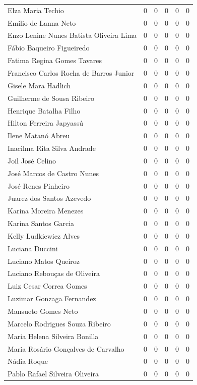 \documentclass[12pt,brazil]{article}\usepackage[]{graphicx}\usepackage[]{xcolor}
\begin{document}
\begin{longtable}{lrrrrr}
Elza Maria Techio & 0 & 0 & 0 & 0 & 0 \\
Emilio de Lanna Neto & 0 & 0 & 0 & 0 & 0 \\
Enzo Lenine Nunes Batista Oliveira Lima & 0 & 0 & 0 & 0 & 0 \\
Fábio Baqueiro Figueiredo & 0 & 0 & 0 & 0 & 0 \\
Fatima Regina Gomes Tavares & 0 & 0 & 0 & 0 & 0 \\
Francisco Carlos Rocha de Barros Junior & 0 & 0 & 0 & 0 & 0 \\
Gisele Mara Hadlich & 0 & 0 & 0 & 0 & 0 \\
Guilherme de Sousa Ribeiro & 0 & 0 & 0 & 0 & 0 \\
Henrique Batalha Filho & 0 & 0 & 0 & 0 & 0 \\
Hilton Ferreira Japyassú & 0 & 0 & 0 & 0 & 0 \\
Ilene Matanó Abreu & 0 & 0 & 0 & 0 & 0 \\
Inacilma Rita Silva Andrade & 0 & 0 & 0 & 0 & 0 \\
Joil José Celino & 0 & 0 & 0 & 0 & 0 \\
José Marcos de Castro Nunes & 0 & 0 & 0 & 0 & 0 \\
José Renes Pinheiro & 0 & 0 & 0 & 0 & 0 \\
Juarez dos Santos Azevedo & 0 & 0 & 0 & 0 & 0 \\
Karina Moreira Menezes & 0 & 0 & 0 & 0 & 0 \\
Karina Santos Garcia & 0 & 0 & 0 & 0 & 0 \\
Kelly Ludkiewicz Alves & 0 & 0 & 0 & 0 & 0 \\
Luciana Duccini & 0 & 0 & 0 & 0 & 0 \\
Luciano Matos Queiroz & 0 & 0 & 0 & 0 & 0 \\
Luciano Rebouças de Oliveira & 0 & 0 & 0 & 0 & 0 \\
Luiz Cesar Correa Gomes & 0 & 0 & 0 & 0 & 0 \\
Luzimar Gonzaga Fernandez & 0 & 0 & 0 & 0 & 0 \\
Mansueto Gomes Neto & 0 & 0 & 0 & 0 & 0 \\
Marcelo Rodrigues Souza Ribeiro & 0 & 0 & 0 & 0 & 0 \\
Maria Helena Silveira Bonilla & 0 & 0 & 0 & 0 & 0 \\
Maria Rosário Gonçalves de Carvalho & 0 & 0 & 0 & 0 & 0 \\
Nádia Roque & 0 & 0 & 0 & 0 & 0 \\
Pablo Rafael Silveira Oliveira & 0 & 0 & 0 & 0 & 0 \\

\end{longtable}
\end{document}
